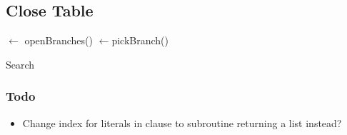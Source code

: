 \documentclass{article}
\begin{document}
\subsection{Close Table}

\begin{algorithm}[H]

  \SetAlgoLined
  \openbranches$\leftarrow$ openBranches(\tbl)\;
  \branch$\leftarrow$pickBranch(\tbl)\;
  \Return \none
 \caption{Search}
\end{algorithm}

\subsubsection{Todo}
\begin{itemize}
  \item Change index for literals in clause to subroutine returning a list instead?
\end{itemize}
\end{document}
